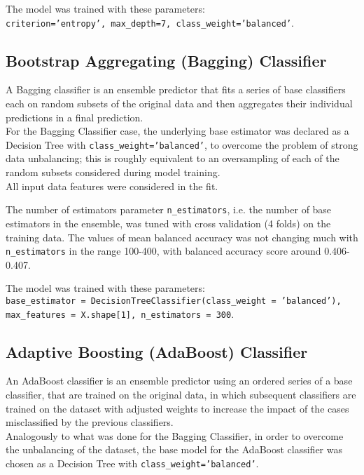 \documentclass[11pt]{article}
\begin{document}
The model was trained with these parameters:\\
\texttt{criterion='entropy', max\_depth=7, class\_weight='balanced'}.

    \hypertarget{bootstrap-aggregating-bagging-classifier}{%
\subsection{Bootstrap Aggregating (Bagging) Classifier}\label{bootstrap-aggregating-bagging-classifier}}

A Bagging classifier is an ensemble predictor that fits a series of base classifiers each on random subsets of the original data and then aggregates their individual predictions in a final prediction.\\
For the Bagging Classifier case, the underlying base estimator was declared as a Decision Tree with \texttt{class\_weight='balanced'}, to overcome the problem of strong data unbalancing; this is roughly equivalent to an oversampling of each of the random subsets considered during model training.\\
All input data features were considered in the fit.

The number of estimators parameter \texttt{n\_estimators}, i.e. the number of base estimators in the ensemble, was tuned with cross validation (4 folds) on the training data. The values of mean balanced accuracy was not changing much with \texttt{n\_estimators} in the range 100-400, with balanced accuracy score around 0.406-0.407.

The model was trained with these parameters:\\
\texttt{base\_estimator = DecisionTreeClassifier(class\_weight = 'balanced'), max\_features = X.shape[1], n\_estimators = 300}.

    \hypertarget{adaptive-boosting}{%
\subsection{Adaptive Boosting (AdaBoost) Classifier}\label{adaptive-boosting}}

An AdaBoost classifier is an ensemble predictor using an ordered series of a base classifier, that are trained on the original data, in which subsequent classifiers are trained on the dataset with adjusted weights to increase the impact of the cases misclassified by the previous classifiers.\\
Analogously to what was done for the Bagging Classifier, in order to overcome the unbalancing of the dataset, the base model for the AdaBoost classifier was chosen as a Decision Tree with \texttt{class\_weight='balanced'}.
\end{document}
